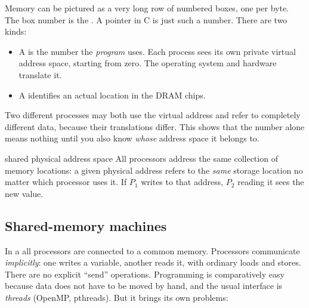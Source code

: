 Memory can be pictured as a very long row of numbered boxes, one per byte. The box number is the
. A pointer in C is just such a number. There are two kinds:
\begin{itemize}
  \item A  is the number the \emph{program} uses. Each process sees its own private virtual
        address space, starting from zero. The operating system and hardware translate it.
  \item A  identifies an actual location in the DRAM chips.
\end{itemize}
Two different processes may both use the virtual address  and refer to completely different
data, because their translations differ. This shows that the number alone means nothing until you also know \emph{whose} address space it
belongs to.

\begin{definition}{shared physical address space}
All processors address the same collection of memory locations: a given physical address refers to the \emph{same}
storage location no matter which processor uses it. If $P_1$ writes to that address, $P_2$
reading it sees the new value.
\end{definition}

\subsection{Shared-memory machines}

\begin{center}
\end{center}

In a  all processors are connected to a common memory. Processors
communicate \emph{implicitly}: one writes a variable, another reads it, with ordinary loads and
stores. There are no explicit ``send'' operations. Programming is comparatively easy because data does not
have to be moved by hand, and the usual interface is \emph{threads} (OpenMP, pthreads). But it brings its own problems:

